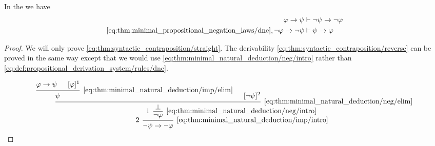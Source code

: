 \begin{proposition}\label{thm:syntactic_contraposition}
  In the  we have
  \begin{align}
    \varphi \rightarrow \psi &\vdash \neg \psi \rightarrow \neg \varphi \label{eq:thm:syntactic_contraposition/straight} \\
    \eqref{eq:thm:minimal_propositional_negation_laws/dne}, \neg \varphi \rightarrow \neg \psi &\vdash \psi \rightarrow \varphi \label{eq:thm:syntactic_contraposition/reverse}
  \end{align}
\end{proposition}
\begin{proof}
  We will only prove \eqref{eq:thm:syntactic_contraposition/straight}. The derivability \eqref{eq:thm:syntactic_contraposition/reverse} can be proved in the same way except that we would use \eqref{eq:thm:minimal_natural_deduction/neg/intro} rather than \eqref{eq:def:propositional_derivation_system/rules/dne}.

  \begin{equation*}
    \begin{prooftree}
      \hypo{ \varphi \rightarrow \psi }
      \hypo{ [\varphi]^1 }
      \infer2[\eqref{eq:thm:minimal_natural_deduction/imp/elim}]{ \psi }

      \hypo{ [\neg \psi]^2 }
      \infer2[\eqref{eq:thm:minimal_natural_deduction/neg/elim}]{ \bot }

      \infer[left label=\( 1 \)]1[\eqref{eq:thm:minimal_natural_deduction/neg/intro}]{ \neg \varphi }
      \infer[left label=\( 2 \)]1[\eqref{eq:thm:minimal_natural_deduction/imp/intro}]{ \neg \psi \rightarrow \neg \varphi }
    \end{prooftree}
  \end{equation*}
\end{proof}

